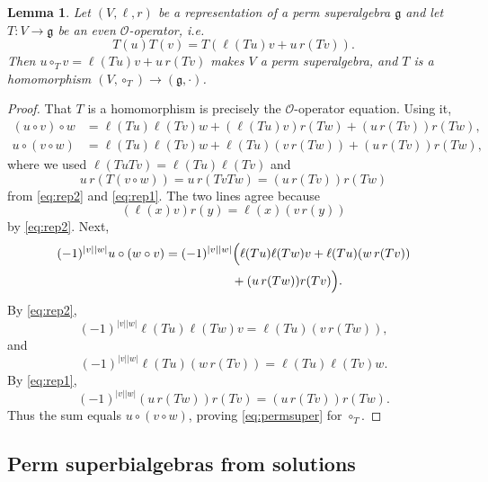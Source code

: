 \documentclass[11pt]{article}
\newtheorem{lemma}[theorem]{Lemma}
\theoremstyle{definition}
\newcommand{\g}{\mathfrak{g}}
\begin{document}
\begin{lemma}\label{lem:Operm}
Let $(V,\ell,r)$ be a representation of a perm superalgebra $\g$ and let $T:V\to\g$ be an even $\mathcal O$-operator, i.e.
\[
T(u)T(v)=T(\ell(Tu)v+u\,r(Tv)).
\]
Then $u\circ_Tv=\ell(Tu)v+u\,r(Tv)$ makes $V$ a perm superalgebra, and $T$ is a homomorphism $(V,\circ_T)\to(\g,\cdot)$.
\end{lemma}
\begin{proof}
That $T$ is a homomorphism is precisely the $\mathcal O$-operator equation. Using it,
\begin{align*}
(u\circ v)\circ w
&=\ell(Tu)\ell(Tv)w+(\ell(Tu)v)r(Tw)+(u\,r(Tv))r(Tw),\\
u\circ(v\circ w)
&=\ell(Tu)\ell(Tv)w+\ell(Tu)(v\,r(Tw))+(u\,r(Tv))r(Tw),
\end{align*}
where we used $\ell(TuTv)=\ell(Tu)\ell(Tv)$ and
\[
u\,r(T(v\circ w))=u\,r(TvTw)=(u\,r(Tv))r(Tw)
\]
from \eqref{eq:rep2} and \eqref{eq:rep1}. The two lines agree because
\[
(\ell(x)v)r(y)=\ell(x)(v\,r(y))
\]
by \eqref{eq:rep2}. Next,
\[
\begin{aligned}
(-1)^{|v||w|}u\circ(w\circ v)
={}&(-1)^{|v||w|}\Bigl(\ell(Tu)\ell(Tw)v+\ell(Tu)(w\,r(Tv))\\
&\qquad\qquad+(u\,r(Tw))r(Tv)\Bigr).
\end{aligned}
\]
By \eqref{eq:rep2},
\[
(-1)^{|v||w|}\ell(Tu)\ell(Tw)v=\ell(Tu)(v\,r(Tw)),
\]
and
\[
(-1)^{|v||w|}\ell(Tu)(w\,r(Tv))=\ell(Tu)\ell(Tv)w.
\]
By \eqref{eq:rep1},
\[
(-1)^{|v||w|}(u\,r(Tw))r(Tv)=(u\,r(Tv))r(Tw).
\]
Thus the sum equals $u\circ(v\circ w)$, proving \eqref{eq:permsuper} for $\circ_T$.
\end{proof}

\subsection{Perm superbialgebras from solutions}
\end{document}
